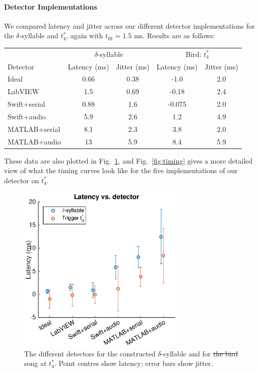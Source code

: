 \documentclass[10pt,letterpaper]{article}
\newcommand\fig[1]{Fig.~\ref{#1}}
\renewcommand{\subsubsection}[1]{\paragraph{#1}}
\providecommand{\DIFaddtex}[1]{{\protect\color{blue}\uwave{#1}}} %
\providecommand{\DIFdeltex}[1]{{\protect\color{red}\sout{#1}}}                      %
\providecommand{\DIFaddbegin}{} %
\providecommand{\DIFaddend}{} %
\providecommand{\DIFdelbegin}{} %
\providecommand{\DIFdelend}{} %
\providecommand{\DIFaddFL}[1]{\DIFadd{#1}} %
\providecommand{\DIFdelFL}[1]{\DIFdel{#1}} %
\providecommand{\DIFaddbeginFL}{} %
\providecommand{\DIFaddendFL}{} %
\providecommand{\DIFdelbeginFL}{} %
\providecommand{\DIFdelendFL}{} %
\providecommand{\DIFadd}[1]{\texorpdfstring{\DIFaddtex{#1}}{#1}} %
\providecommand{\DIFdel}[1]{\texorpdfstring{\DIFdeltex{#1}}{}} %
\newcommand{\DIFscaledelfig}{0.5}
\newlength{\DIFdelgraphicswidth} %
\newlength{\DIFdelgraphicsheight} %
\newcommand{\DIFaddincludegraphics}[2][]{{\color{blue}\fbox{\DIFOincludegraphics[#1]{#2}}}} %
\newcommand{\DIFdelincludegraphics}[2][]{%
\sbox{\DIFdelgraphicsbox}{\DIFOincludegraphics[#1]{#2}}%
\settoboxwidth{\DIFdelgraphicswidth}{\DIFdelgraphicsbox} %
\settoboxtotalheight{\DIFdelgraphicsheight}{\DIFdelgraphicsbox} %
\scalebox{\DIFscaledelfig}{%
\parbox[b]{\DIFdelgraphicswidth}{\usebox{\DIFdelgraphicsbox}\\[-\baselineskip] \rule{\DIFdelgraphicswidth}{0em}}\llap{\resizebox{\DIFdelgraphicswidth}{\DIFdelgraphicsheight}{%
\setlength{\unitlength}{\DIFdelgraphicswidth}%
\begin{picture}(1,1)%
\thicklines\linethickness{2pt} %
{\color[rgb]{1,0,0}\put(0,0){\framebox(1,1){}}}%
{\color[rgb]{1,0,0}\put(0,0){\line( 1,1){1}}}%
{\color[rgb]{1,0,0}\put(0,1){\line(1,-1){1}}}%
\end{picture}%
}\hspace*{3pt}}} %
} %
\DeclareRobustCommand{\DIFaddbegin}{\DIFOaddbegin \let\includegraphics\DIFaddincludegraphics} %
\DeclareRobustCommand{\DIFaddend}{\DIFOaddend \let\includegraphics\DIFOincludegraphics} %
\DeclareRobustCommand{\DIFdelbegin}{\DIFOdelbegin \let\includegraphics\DIFdelincludegraphics} %
\DeclareRobustCommand{\DIFdelend}{\DIFOaddend \let\includegraphics\DIFOincludegraphics} %
\DeclareRobustCommand{\DIFaddbeginFL}{\DIFOaddbeginFL \let\includegraphics\DIFaddincludegraphics} %
\DeclareRobustCommand{\DIFaddendFL}{\DIFOaddendFL \let\includegraphics\DIFOincludegraphics} %
\DeclareRobustCommand{\DIFdelbeginFL}{\DIFOdelbeginFL \let\includegraphics\DIFdelincludegraphics} %
\DeclareRobustCommand{\DIFdelendFL}{\DIFOaddendFL \let\includegraphics\DIFOincludegraphics} %
\begin{document}
\subsubsection{Detector Implementations}


We compared latency and jitter across our different detector
implementations for the $\delta$-syllable and \DIFaddbegin \DIFadd{lny64's }\DIFaddend $t^*_4$, again with
$t_\mathrm{fft}=1.5$ ms.  Results are as follows:
\vspace{8pt}
\DIFdelbegin %
\DIFdelend \DIFaddbegin \begin{tabular}{l|c|c|c|c}
  \DIFaddend & \multicolumn{2}{c}{$\delta$-syllable} & \multicolumn{2}{c}{Bird: $t^*_4$} \\
  Detector & Latency (ms) & Jitter (ms) & Latency (ms) & Jitter (ms) \\
  \hline
  Ideal & 0.66 & 0.38 & -1.0 & 2.0 \\
  LabVIEW & 1.5 & 0.69 & -0.18 & 2.4 \\
  Swift+serial & 0.88 & 1.6 & -0.075 & 2.0 \\
  Swift+audio & 5.9 & 2.6 & 1.2 & 4.9 \\
  MATLAB+serial & 8.1 & 2.3 & 3.8 & 2.0 \\
  MATLAB+audio & 13 & 5.9 & 8.4 & 5.9
\end{tabular}
\vspace{8pt}\par\noindent
These data are also plotted in \fig{fig:TimingVsDetector}, and
\fig{fig:timing} gives a more detailed view of what the timing curves
look like for the five implementations of our detector on $t^*_4$.

\begin{figure}
  \begin{center}
    \includegraphics[width=8cm]{Fig6}
  \end{center}
  \caption{The different detectors for the constructed
    $\delta$-syllable and for \DIFdelbeginFL \DIFdelFL{the bird }\DIFdelendFL \DIFaddbeginFL \DIFaddFL{lny64's }\DIFaddendFL song at $t^*_4$.  Point centres
    show latency; error bars show jitter.}
  \label{fig:TimingVsDetector}
\end{figure}
\end{document}
